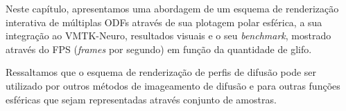 \documentclass[
    12pt,                %
    oneside,            %
    a4paper,            %
    english,            %
    french,                %
    spanish,            %
    brazil                %
    ]{abntex2}
\begin{document}

Neste capítulo, apresentamos uma abordagem de um esquema de renderização interativa de múltiplas ODFs através de sua plotagem polar esférica, a sua integração ao VMTK-Neuro, resultados visuais e o seu \textit{benchmark}, mostrado através do FPS (\textit{frames} por segundo) em função da quantidade de glifo.

Ressaltamos que o esquema de renderização de perfis de difusão pode ser utilizado por outros métodos de imageamento de difusão e para outras funções esféricas que sejam representadas através conjunto de amostras.




\end{document}
